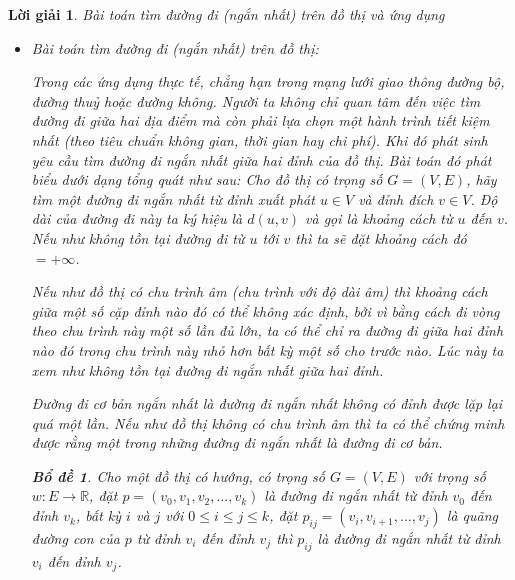 \documentclass[14pt, a4paper]{article}
\newtheorem{bd}{Bổ đề}
\theoremstyle{sltheorem}
\theoremstyle{soltheorem}
\newtheorem*{loigiai}{Lời giải}
\begin{document}
    \begin{loigiai}

        Bài toán tìm đường đi (ngắn nhất) trên đồ thị và ứng dụng

        \begin{itemize}
            \item Bài toán tìm đường đi (ngắn nhất) trên đồ thị:
            
            Trong các ứng dụng thực tế, chẳng hạn trong mạng lưới giao thông đường bộ, đường thuỷ hoặc
            đường không. Người ta không chỉ quan tâm đến việc tìm đường đi giữa hai địa điểm mà còn phải
            lựa chọn một hành trình tiết kiệm nhất (theo tiêu chuẩn không gian, thời gian hay chi phí). Khi đó
            phát sinh yêu cầu tìm đường đi ngắn nhất giữa hai đỉnh của đồ thị. Bài toán đó phát biểu dưới dạng
            tổng quát như sau: Cho đồ thị có trọng số $G=(V, E)$, hãy tìm một đường đi ngắn nhất từ đỉnh xuất
            phát $u \in V$ và đỉnh đích $v \in V$. Độ dài của đường đi này ta ký hiệu là $d(u, v)$ và gọi là khoảng
            cách từ $u$ đến $v$. Nếu như không tồn tại đường đi từ $u$ tới $v$ thì ta sẽ đặt khoảng cách đó $=+ \infty$.
            
            Nếu như đồ thị có chu trình âm (chu trình với độ dài âm) thì khoảng cách giữa một số cặp đỉnh nào
            đó có thể không xác định, bởi vì bằng cách đi vòng theo chu trình này một số lần đủ lớn, ta có thể
            chỉ ra đường đi giữa hai đỉnh nào đó trong chu trình này nhỏ hơn bất kỳ một số cho trước nào.
            Lúc này ta xem như không tồn tại đường đi ngắn nhất giữa hai đỉnh.

            Đường đi cơ bản ngắn nhất là đường đi ngắn nhất không có đỉnh được lặp lại quá một lần.
            Nếu như đồ thị không có chu trình âm thì ta có thể chứng minh được rằng một trong những đường
            đi ngắn nhất là đường đi cơ bản.

            \begin{bd}
                Cho một đồ thị có hướng, có trọng số $G=(V, E)$ với trọng số $w: E \rightarrow \mathbb{R}$,
                đặt $p=(v_0, v_1, v_2, \dots, v_k)$ là đường đi ngắn nhất từ đỉnh $v_0$ đến đỉnh $v_k$, bất kỳ $i$ và $j$ với $0 \leq i \leq j \leq k$,
                đặt $p_{ij}=(v_i, v_{i+1}, \dots, v_j)$ là quãng đường con của $p$ từ đỉnh $v_i$ đến đỉnh $v_j$ thì $p_{ij}$ là đường đi ngắn nhất từ đỉnh $v_i$ đến đỉnh $v_j$.

                \label{bd:Shortest-path}
            \end{bd}


\end{itemize}
\end{loigiai}
\end{document}
